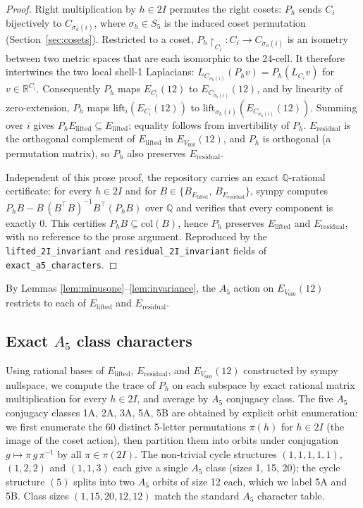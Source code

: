 \documentclass[11pt]{article}
\newcommand{\Vsix}{V_{600}}
\newcommand{\Esix}{E_{\Vsix}}
\newcommand{\Elift}{E_{\mathrm{lifted}}}
\newcommand{\Eres}{E_{\mathrm{residual}}}
\newcommand{\twoI}{2I}
\theoremstyle{plain}
\theoremstyle{definition}
\begin{document}
\begin{proof}
Right multiplication by $h\in\twoI$ permutes the right cosets:
$P_h$ sends $C_i$ bijectively to $C_{\sigma_h(i)}$, where
$\sigma_h\in S_5$ is the induced coset permutation
(Section~\ref{sec:cosets}).  Restricted to a coset, $P_h\!\restriction_{C_i}\colon
C_i \to C_{\sigma_h(i)}$ is an isometry between two metric spaces
that are each isomorphic to the 24-cell.  It therefore intertwines
the two local shell-1 Laplacians: $L_{C_{\sigma_h(i)}} (P_h v) =
P_h (L_{C_i} v)$ for $v\in\mathbb{R}^{C_i}$.  Consequently $P_h$
maps $E_{C_i}(12)$ to $E_{C_{\sigma_h(i)}}(12)$, and by linearity of
zero-extension, $P_h$ maps $\mathrm{lift}_i(E_{C_i}(12))$ to
$\mathrm{lift}_{\sigma_h(i)}(E_{C_{\sigma_h(i)}}(12))$.  Summing
over $i$ gives $P_h \Elift \subseteq \Elift$; equality follows from
invertibility of $P_h$.  $\Eres$ is the orthogonal complement of
$\Elift$ in $\Esix(12)$, and $P_h$ is orthogonal (a permutation
matrix), so $P_h$ also preserves $\Eres$.

\smallskip
\noindent
Independent of this prose proof, the repository carries an exact
$\mathbb{Q}$-rational certificate: for every $h\in\twoI$ and for
$B\in\{B_{\Elift},\,B_{\Eres}\}$, sympy computes
$P_h B - B\,(B^\top B)^{-1} B^\top(P_h B)$ over $\mathbb{Q}$ and
verifies that every component is exactly $0$.  This certifies
$P_h B \subseteq \mathrm{col}(B)$, hence $P_h$ preserves $\Elift$
and $\Eres$, with no reference to the prose argument.  Reproduced by
the \texttt{lifted\_2I\_invariant} and \texttt{residual\_2I\_invariant}
fields of \texttt{exact\_a5\_characters}.
\end{proof}

By Lemmas \ref{lem:minusone}--\ref{lem:invariance}, the $A_5$ action
on $\Esix(12)$ restricts to each of $\Elift$ and $\Eres$.

\subsection{Exact $A_5$ class characters}

Using rational bases of $\Elift$, $\Eres$, and $\Esix(12)$
constructed by sympy nullspace, we compute the trace of $P_h$ on
each subspace by exact rational matrix multiplication for every
$h\in\twoI$, and average by $A_5$ conjugacy class.  The five
$A_5$ conjugacy classes 1A, 2A, 3A, 5A, 5B are obtained by
explicit orbit enumeration: we first enumerate the 60 distinct
5-letter permutations $\pi(h)$ for $h\in\twoI$ (the image of the
coset action), then partition them into orbits under conjugation
$g\mapsto \pi\,g\,\pi^{-1}$ by all $\pi\in\pi(\twoI)$.  The
non-trivial cycle structures $(1,1,1,1,1)$, $(1,2,2)$ and $(1,1,3)$
each give a single $A_5$ class (sizes 1, 15, 20); the cycle
structure $(5)$ splits into two $A_5$ orbits of size 12 each, which
we label 5A and 5B.  Class sizes $(1, 15, 20, 12, 12)$ match the
standard $A_5$ character table.
\end{document}
